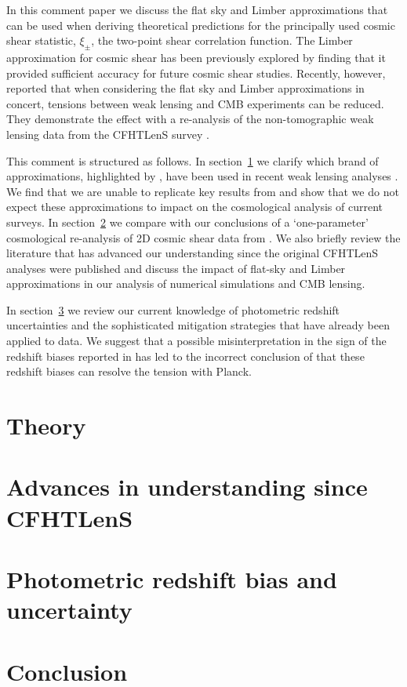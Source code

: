\documentclass[preprint]{aastex}
\begin{document}
In this comment paper we discuss the flat sky and Limber approximations that can be used when deriving theoretical predictions for the principally used cosmic shear statistic, $\xi_\pm$, the two-point shear correlation function. The Limber approximation for cosmic shear has been previously explored by \citet{giannantonio/etal:2012} finding that it provided sufficient accuracy for future cosmic shear studies. Recently, however, \citet{kitching/etal:2016} reported that when considering the flat sky and Limber approximations in concert, tensions between weak lensing and CMB experiments can be reduced. They demonstrate the effect with a re-analysis of the non-tomographic weak lensing data from the CFHTLenS survey \citep{kilbinger/etal:2013}.    

This comment is structured as follows.  In section~\ref{sec:theory} we clarify which brand of approximations, highlighted by \citet{kitching/etal:2016}, have been used in recent weak lensing analyses \citep{joudaki/etal:2016, hildebrandt/etal:2016, joudaki/etal:2017}.  We find that we are unable to replicate key results from \citet{kitching/etal:2016} and show that we do not expect these approximations to impact on the cosmological analysis of current surveys. In section~\ref{sec:cfhtlens} we compare with \citet{kitching/etal:2016} our conclusions of a `one-parameter' cosmological re-analysis of 2D cosmic shear data from \citet{kilbinger/etal:2013}.  We also briefly review the literature that has advanced our understanding since the original CFHTLenS analyses were published and discuss the impact of flat-sky and Limber approximations in our analysis of numerical simulations and CMB lensing.

In section~\ref{sec:photoz} we review our current knowledge of photometric redshift uncertainties and the sophisticated mitigation strategies that have already been applied to data.  We suggest that a possible misinterpretation in the sign of the redshift biases reported in \citet{choi/etal:2016} has led to the incorrect conclusion of \citet{kitching/etal:2016} that these redshift biases can resolve the tension with Planck.  

\section{Theory}
\label{sec:theory}


\section{Advances in understanding since CFHTLenS}
\label{sec:cfhtlens}


\section{Photometric redshift bias and uncertainty}
\label{sec:photoz}


\section{Conclusion}
\label{sec:conclusion}




\end{document}
